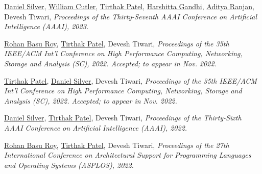 
{\textnormal{\newline \underline{Daniel Silver}, \underline{William Cutler}, \underline{Tirthak Patel}, \underline{Harshitta Gandhi}, \underline{Aditya Ranjan}, Devesh Tiwari,}} {\textit{Proceedings of the Thirty-Seventh AAAI Conference on Artificial Intelligence (AAAI), 2023.\newline}}{}{}{} %



{\textnormal{\newline \underline{Rohan Basu Roy}, \underline{Tirthak Patel}, Devesh Tiwari,}} {\textit{Proceedings of the 35th IEEE/ACM Int'l Conference on High Performance Computing, Networking, Storage and Analysis (SC), 2022. \textit{Accepted; to appear in Nov. 2022}. \newline}}{}{}{} %

{\textnormal{\newline \underline{Tirthak Patel}, \underline{Daniel Silver}, Devesh Tiwari,}} {\textit{Proceedings of the 35th IEEE/ACM Int'l Conference on High Performance Computing, Networking, Storage and Analysis (SC), 2022. \textit{Accepted; to appear in Nov. 2022}. \newline}}{}{}{} %

{\textnormal{\newline \underline{Daniel Silver}, \underline{Tirthak Patel}, Devesh Tiwari,}} {\textit{Proceedings of the Thirty-Sixth AAAI Conference on Artificial Intelligence (AAAI), 2022.\newline}}{}{}{} %

{\textnormal{\newline \underline{Rohan Basu Roy}, \underline{Tirthak Patel}, Devesh Tiwari,}} {\textit{Proceedings of the 27th International Conference on Architectural Support for Programming Languages and Operating Systems (ASPLOS), 2022.\newline}}{}{}{} %

